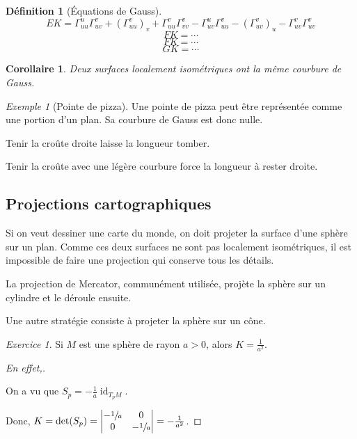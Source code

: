 \documentclass{report}
\newtheorem*{coro}{Corollaire}
\theoremstyle{definition}
\newtheorem*{dfn}{D\'efinition}
\theoremstyle{remark}
\newtheorem*{exem}{Exemple}
\newtheorem*{exer}{Exercice}
\newenvironment*{subproof}[1][D\'emonstration]
{
\begin{proof}[#1]

}
{
\renewcommand{\qedsymbol}{$\blacksquare$}
\end{proof}
\renewcommand{\qedsymbol}{$\square$}
}
\def\iden{\operatorname{id}}
\begin{document}
	\begin{dfn}[\'Equations de Gauss]
		\begin{equation*}
			EK = \Gamma_{uu}^u\Gamma_{uv}^v + \left(\Gamma_{uu}^v\right)_v + \Gamma_{uu}^v\Gamma_{vv}^v - \Gamma_{uv}^u\Gamma_{uu}^v - \left(\Gamma_{uv}^v\right)_u - \Gamma_{uv}^v\Gamma_{uv}^v
		\end{equation*}
		\begin{equation*}
			FK = \cdots
		\end{equation*}
		\begin{equation*}
			FK = \cdots
		\end{equation*}
		\begin{equation*}
			GK = \cdots
		\end{equation*}
	\end{dfn}

	\begin{coro}
		Deux surfaces localement isom\'etriques ont la m\^eme courbure de Gauss.
	\end{coro}

	\begin{exem}[Pointe de pizza]
		Une pointe de pizza peut \^etre repr\'esent\'ee comme une portion d'un plan. Sa courbure de Gauss est donc nulle.

		Tenir la cro\^ute droite laisse la longueur tomber.

		Tenir la cro\^ute avec une l\'eg\`ere courbure force la longueur \`a rester droite.
	\end{exem}

	\subsection{Projections cartographiques}
	Si on veut dessiner une carte du monde, on doit projeter la surface d'une sph\`ere sur un plan. Comme ces deux surfaces ne sont pas localement isom\'etriques, il est impossible de faire une projection qui conserve tous les d\'etails.

	La projection de Mercator, commun\'ement utilis\'ee, proj\`ete la sph\`ere sur un cylindre et le d\'eroule ensuite.

	Une autre strat\'egie consiste \`a projeter la sph\`ere sur un c\^one.

	\begin{exer}
		Si $M$ est une sph\`ere de rayon $a>0$, alors $K=\frac{1}{a^2}$.
		\begin{subproof}[En effet,]~

			On a vu que $S_p=-\frac{1}{a}\iden_{T_pM}$.

			Donc, $K = \det(S_p) = \begin{vmatrix}
				-\sfrac{1}{a}&0\\0&-\sfrac{1}{a}
			\end{vmatrix} = -\frac{1}{a^2}$.
		\end{subproof}
	\end{exer}
\end{document}
